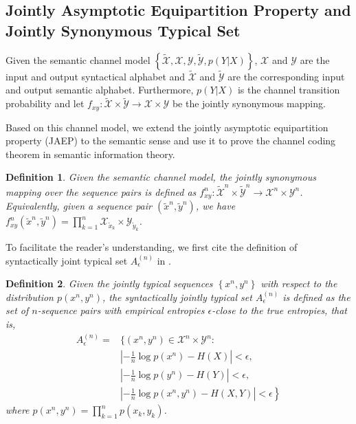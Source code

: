 \documentclass[12pt, draftclsnofoot,onecolumn]{IEEEtran}
\newtheorem{definition}{\bf{Definition}}
\begin{document}
\subsection{Jointly Asymptotic Equipartition Property and Jointly Synonymous Typical Set}
Given the semantic channel model $\left\{\tilde{\mathcal{X}},\mathcal{X},\mathcal{Y},\tilde{\mathcal{Y}}, p(Y|X)\right\}$, $\mathcal{X}$ and $\mathcal{Y}$ are the input and output syntactical alphabet and $\tilde{\mathcal{X}}$ and $\tilde{\mathcal{Y}}$ are the corresponding input and output semantic alphabet. Furthermore, $p(Y|X)$ is the channel transition probability and let $f_{xy}:\tilde{\mathcal{X}}\times\tilde{\mathcal{Y}}\to\mathcal{X}\times\mathcal{Y}$ be the jointly synonymous mapping.

Based on this channel model, we extend the jointly asymptotic equipartition property (JAEP) to the semantic sense and use it to prove the channel coding theorem in semantic information theory.

\begin{definition}
Given the semantic channel model, the jointly synonymous mapping over the sequence pairs is defined as $f_{xy}^{n}: \tilde{\mathcal{X}}^{n}\times \tilde{\mathcal{Y}}^{n} \to \mathcal{X}^{n}\times \mathcal{Y}^{n}$. Equivalently, given a sequence pair $\left(\tilde {x}^n,\tilde {y}^n\right)$, we have $f_{xy}^n\left(\tilde {x}^n, \tilde {y}^n \right)=\prod_{k=1}^{n}{\mathcal{X}}_{\tilde{x}_{k}}\times {\mathcal{Y}}_{\tilde{y}_{k}}$.
\end{definition}

To facilitate the reader's understanding, we first cite the definition of syntactically joint typical set $A_{\epsilon}^{(n)}$ in \cite{Book_Cover}.
\begin{definition}\label{Syn_JTS}
Given the jointly typical sequences $\left\{x^n,y^n\right\}$ with respect to the distribution $p(x^n,y^n)$, the syntactically jointly typical set $A_{\epsilon}^{(n)}$ is defined as the set of $n$-sequence pairs with empirical entropies $\epsilon$-close to the true entropies, that is,
\begin{equation}
\begin{aligned}
A_{\epsilon}^{(n)}=& \bigg\{\left(x^n,y^n\right) \in {\mathcal{X}}^n\times \mathcal{Y}^n:  \\
                                & \left|-\frac{1}{n}\log p\left(x^n\right)-H(X)\right|<\epsilon,\\
                                & \left|-\frac{1}{n}\log p\left(y^n\right)-H(Y)\right|<\epsilon,\\
                                & \left. \left|-\frac{1}{n}\log p\left(x^n,y^n\right)-H(X,Y)\right|<\epsilon \right\}
\end{aligned}
\end{equation}
where $p\left(x^n,y^n\right)=\prod_{k=1}^{n} p(x_k,y_k)$.
\end{definition}
\end{document}
